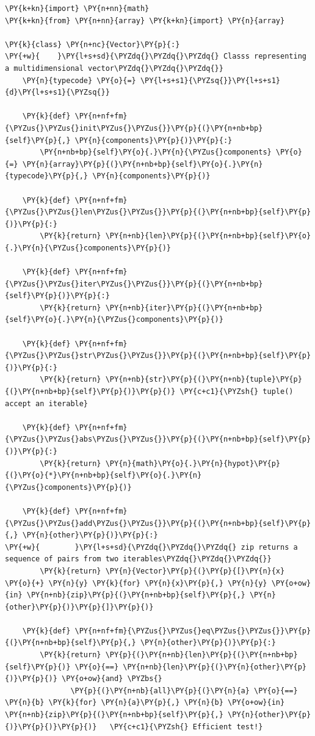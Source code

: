 \begin{Verbatim}[label=\makebox{\url{https://github.com/lucabaldini/cmepda/tree/master/slides/latex/snippets/vector\_ducked.py}},commandchars=\\\{\}]
\PY{k+kn}{import} \PY{n+nn}{math}
\PY{k+kn}{from} \PY{n+nn}{array} \PY{k+kn}{import} \PY{n}{array}

\PY{k}{class} \PY{n+nc}{Vector}\PY{p}{:}
\PY{+w}{    }\PY{l+s+sd}{\PYZdq{}\PYZdq{}\PYZdq{} Classs representing a multidimensional vector\PYZdq{}\PYZdq{}\PYZdq{}}    
    \PY{n}{typecode} \PY{o}{=} \PY{l+s+s1}{\PYZsq{}}\PY{l+s+s1}{d}\PY{l+s+s1}{\PYZsq{}}
    
    \PY{k}{def} \PY{n+nf+fm}{\PYZus{}\PYZus{}init\PYZus{}\PYZus{}}\PY{p}{(}\PY{n+nb+bp}{self}\PY{p}{,} \PY{n}{components}\PY{p}{)}\PY{p}{:}
        \PY{n+nb+bp}{self}\PY{o}{.}\PY{n}{\PYZus{}components} \PY{o}{=} \PY{n}{array}\PY{p}{(}\PY{n+nb+bp}{self}\PY{o}{.}\PY{n}{typecode}\PY{p}{,} \PY{n}{components}\PY{p}{)}
    
    \PY{k}{def} \PY{n+nf+fm}{\PYZus{}\PYZus{}len\PYZus{}\PYZus{}}\PY{p}{(}\PY{n+nb+bp}{self}\PY{p}{)}\PY{p}{:}
        \PY{k}{return} \PY{n+nb}{len}\PY{p}{(}\PY{n+nb+bp}{self}\PY{o}{.}\PY{n}{\PYZus{}components}\PY{p}{)}    
    
    \PY{k}{def} \PY{n+nf+fm}{\PYZus{}\PYZus{}iter\PYZus{}\PYZus{}}\PY{p}{(}\PY{n+nb+bp}{self}\PY{p}{)}\PY{p}{:}
        \PY{k}{return} \PY{n+nb}{iter}\PY{p}{(}\PY{n+nb+bp}{self}\PY{o}{.}\PY{n}{\PYZus{}components}\PY{p}{)}
    
    \PY{k}{def} \PY{n+nf+fm}{\PYZus{}\PYZus{}str\PYZus{}\PYZus{}}\PY{p}{(}\PY{n+nb+bp}{self}\PY{p}{)}\PY{p}{:}
        \PY{k}{return} \PY{n+nb}{str}\PY{p}{(}\PY{n+nb}{tuple}\PY{p}{(}\PY{n+nb+bp}{self}\PY{p}{)}\PY{p}{)} \PY{c+c1}{\PYZsh{} tuple() accept an iterable}
    
    \PY{k}{def} \PY{n+nf+fm}{\PYZus{}\PYZus{}abs\PYZus{}\PYZus{}}\PY{p}{(}\PY{n+nb+bp}{self}\PY{p}{)}\PY{p}{:}
        \PY{k}{return} \PY{n}{math}\PY{o}{.}\PY{n}{hypot}\PY{p}{(}\PY{o}{*}\PY{n+nb+bp}{self}\PY{o}{.}\PY{n}{\PYZus{}components}\PY{p}{)}
    
    \PY{k}{def} \PY{n+nf+fm}{\PYZus{}\PYZus{}add\PYZus{}\PYZus{}}\PY{p}{(}\PY{n+nb+bp}{self}\PY{p}{,} \PY{n}{other}\PY{p}{)}\PY{p}{:}
\PY{+w}{        }\PY{l+s+sd}{\PYZdq{}\PYZdq{}\PYZdq{} zip returns a sequence of pairs from two iterables\PYZdq{}\PYZdq{}\PYZdq{}}
        \PY{k}{return} \PY{n}{Vector}\PY{p}{(}\PY{p}{[}\PY{n}{x} \PY{o}{+} \PY{n}{y} \PY{k}{for} \PY{n}{x}\PY{p}{,} \PY{n}{y} \PY{o+ow}{in} \PY{n+nb}{zip}\PY{p}{(}\PY{n+nb+bp}{self}\PY{p}{,} \PY{n}{other}\PY{p}{)}\PY{p}{]}\PY{p}{)}
    
    \PY{k}{def} \PY{n+nf+fm}{\PYZus{}\PYZus{}eq\PYZus{}\PYZus{}}\PY{p}{(}\PY{n+nb+bp}{self}\PY{p}{,} \PY{n}{other}\PY{p}{)}\PY{p}{:}
        \PY{k}{return} \PY{p}{(}\PY{n+nb}{len}\PY{p}{(}\PY{n+nb+bp}{self}\PY{p}{)} \PY{o}{==} \PY{n+nb}{len}\PY{p}{(}\PY{n}{other}\PY{p}{)}\PY{p}{)} \PY{o+ow}{and} \PYZbs{}
               \PY{p}{(}\PY{n+nb}{all}\PY{p}{(}\PY{n}{a} \PY{o}{==} \PY{n}{b} \PY{k}{for} \PY{n}{a}\PY{p}{,} \PY{n}{b} \PY{o+ow}{in} \PY{n+nb}{zip}\PY{p}{(}\PY{n+nb+bp}{self}\PY{p}{,} \PY{n}{other}\PY{p}{)}\PY{p}{)}\PY{p}{)}   \PY{c+c1}{\PYZsh{} Efficient test!}
\end{Verbatim}